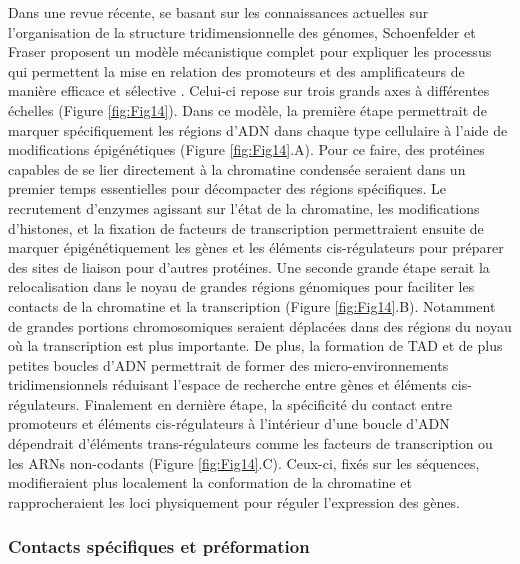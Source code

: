 Dans une revue récente, se basant sur les connaissances actuelles sur l’organisation de la structure tridimensionnelle des génomes, Schoenfelder et Fraser proposent un modèle mécanistique complet pour expliquer les processus qui permettent la mise en relation des promoteurs et des \glspl{amplificateur} de manière efficace et sélective \citep{schoenfelder_long-range_2019}. Celui-ci repose sur trois grands axes à différentes échelles (Figure \ref{fig:Fig14}). Dans ce modèle, la première étape permettrait de marquer spécifiquement les régions d’ADN dans chaque type cellulaire à l’aide de modifications épigénétiques (Figure \ref{fig:Fig14}.A). Pour ce faire, des protéines capables de se lier directement à la chromatine condensée seraient dans un premier temps essentielles pour décompacter des régions spécifiques. Le recrutement d’enzymes agissant sur l’état de la chromatine, les modifications d'histones,  et la fixation de facteurs de transcription permettraient ensuite de marquer épigénétiquement les gènes et les éléments \gls{cis}-régulateurs pour préparer des sites de liaison pour d’autres protéines. Une seconde grande étape serait la relocalisation dans le noyau de grandes régions génomiques pour faciliter les contacts de la chromatine et la transcription (Figure \ref{fig:Fig14}.B). Notamment de grandes portions chromosomiques seraient déplacées dans des régions du noyau où la transcription est plus importante. De plus, la formation de \acrshort{TAD} et de plus petites boucles d’ADN permettrait de former des micro-environnements tridimensionnels réduisant l’espace de recherche entre gènes et éléments \gls{cis}-régulateurs. Finalement en dernière étape, la spécificité du contact entre promoteurs et éléments \gls{cis}-régulateurs à l’intérieur d’une boucle d’ADN dépendrait d’éléments \gls{trans}-régulateurs comme les facteurs de transcription ou les \acrshort{ARN}s non-codants (Figure \ref{fig:Fig14}.C). Ceux-ci, fixés sur les séquences, modifieraient plus localement la conformation de la chromatine et rapprocheraient les loci physiquement pour réguler l’expression des gènes.


\subsubsection{Contacts spécifiques et préformation}
\label{subsubsec:specifique-preformation}

